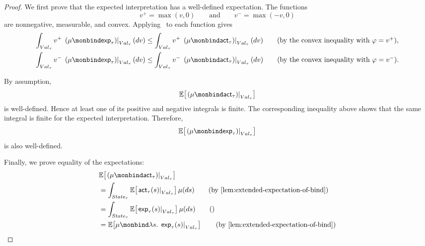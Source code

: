 \begin{proof}

  We first prove that the expected interpretation has a well-defined
  expectation. The functions
  \[
    v^+=\max(v,0)
    \qquad\text{and}\qquad
    v^-=\max(-v,0)
  \]
  are nonnegative, measurable, and convex. Applying~ to each function gives
  \begin{align}
    \int_{Val_\tau}
      v^+\,
      \left.
        (\mu\monbind\mathsf{exp}_\tau)
      \right|_{Val_\tau}(dv)
    &\leq
    \int_{Val_\tau}
      v^+\,
      \left.
        (\mu\monbind\mathsf{act}_\tau)
      \right|_{Val_\tau}(dv)
    \tag{\text{by the convex inequality with $\varphi=v^+$}},
    \\
    \int_{Val_\tau}
      v^-\,
      \left.
        (\mu\monbind\mathsf{exp}_\tau)
      \right|_{Val_\tau}(dv)
    &\leq
    \int_{Val_\tau}
      v^-\,
      \left.
        (\mu\monbind\mathsf{act}_\tau)
      \right|_{Val_\tau}(dv)
    \tag{\text{by the convex inequality with $\varphi=v^-$}}.
  \end{align}

  By assumption,
  \[
    \mathbb E\!\left[
      \left.
        (\mu\monbind\mathsf{act}_\tau)
      \right|_{Val_\tau}
    \right]
  \]
  is well-defined. Hence at least one of its positive and negative
  integrals is finite. The corresponding inequality above shows that
  the same integral is finite for the expected interpretation.
  Therefore,
  \[
    \mathbb E\!\left[
      \left.
        (\mu\monbind\mathsf{exp}_\tau)
      \right|_{Val_\tau}
    \right]
  \]
  is also well-defined.

  Finally, we prove equality of the expectations:
  \begin{align}
    &\mathbb E\!\left[
      \left.
        (\mu\monbind\mathsf{act}_\tau)
      \right|_{Val_\tau}
    \right]
    \notag
    \\
    &=
    \int_{State_\tau}
      \mathbb E\!\left[
        \left.\mathsf{act}_\tau(s)\right|_{Val_\tau}
      \right]
      \mu(ds)
    \tag{\text{by \Cref{lem:extended-expectation-of-bind}}}
    \\
    &=
    \int_{State_\tau}
      \mathbb E\!\left[
        \left.\mathsf{exp}_\tau(s)\right|_{Val_\tau}
      \right]
      \mu(ds)
    \tag{}
    \\
    &=
    \mathbb E\!\left[
      \mu\monbind
      \lambda s.\,
      \left.\mathsf{exp}_\tau(s)\right|_{Val_\tau}
    \right]
    \tag{\text{by \Cref{lem:extended-expectation-of-bind}}}
  \end{align}
\end{proof}

